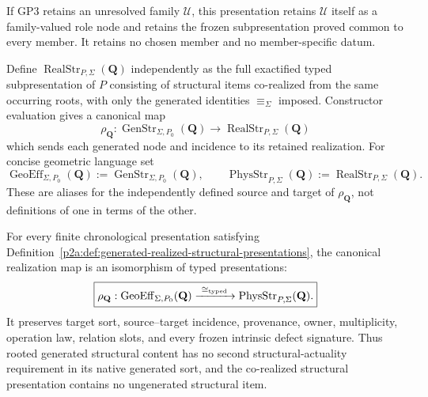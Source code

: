 \documentclass[12pt,a4paper]{article}
\begin{document}
\begin{definition}
If GP3 retains an unresolved family \(\mathcal U\), this presentation retains
\(\mathcal U\) itself as a family-valued role node and retains the frozen
subpresentation proved common to every member.  It retains no chosen member
and no member-specific datum.

Define \(\operatorname{RealStr}_{P,\Sigma}(\mathbf Q)\) independently as the
full exactified typed subpresentation of \(P\) consisting of structural items
co-realized from the same occurring roots, with only the generated identities
\(\equiv_{\Sigma}\) imposed.  Constructor evaluation gives a canonical map
\[
 \rho_{\mathbf Q}:
 \operatorname{GenStr}_{\Sigma,P_0}(\mathbf Q)
 \longrightarrow
 \operatorname{RealStr}_{P,\Sigma}(\mathbf Q)
\]
which sends each generated node and incidence to its retained realization.
For concise geometric language set
\[
 \operatorname{GeoEff}_{\Sigma,P_0}(\mathbf Q)
 :=\operatorname{GenStr}_{\Sigma,P_0}(\mathbf Q),
 \qquad
 \operatorname{PhysStr}_{P,\Sigma}(\mathbf Q)
 :=\operatorname{RealStr}_{P,\Sigma}(\mathbf Q).
\]
These are aliases for the independently defined source and target of
\(\rho_{\mathbf Q}\), not definitions of one in terms of the other.
\end{definition}

\begin{theorem}
\label{p2a:thm:typed-structural-geometrization}
For every finite chronological presentation satisfying
Definition~\ref{p2a:def:generated-realized-structural-presentations}, the
canonical realization map is an isomorphism of typed presentations:
\[
 \boxed{
 \rho_{\mathbf Q}:
 \operatorname{GeoEff}_{\Sigma,P_0}(\mathbf Q)
 \xrightarrow{\ \cong_{\rm typed}\ }
 \operatorname{PhysStr}_{P,\Sigma}(\mathbf Q).}
\]
It preserves target sort, source--target incidence, provenance, owner,
multiplicity, operation law, relation slots, and every frozen intrinsic defect
signature.  Thus rooted generated structural content has no second
structural-actuality requirement in its native generated sort, and the
co-realized structural presentation contains no ungenerated structural item.
\end{theorem}
\end{document}
